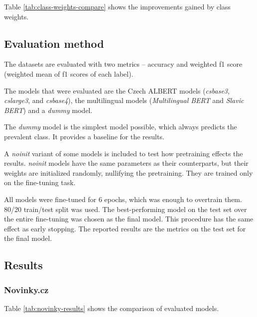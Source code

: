 \documentclass[
  printed, %
  color,   %
  table,   %
  oneside, %
  lof,     %
  lot,     %
]{fithesis3}
\begin{document}
Table \ref{tab:class-weights-compare} shows the improvements gained by class weights.


\subsection{Evaluation method}
\label{sec:class-eval-method}
The datasets are evaluated with two metrics -- accuracy and weighted f1 score (weighted mean of f1 scores of each label).

The models that were evaluated are the Czech ALBERT models (\textit{csbase3}, \textit{cslarge3}, and \textit{csbase4}), the multilingual models (\textit{Multilingual BERT} and \textit{Slavic BERT}) and a \textit{dummy} model. 

The \textit{dummy} model is the simplest model possible, which always predicts the prevalent class. It provides a baseline for the results.

A \textit{noinit} variant of some models is included to test how pretraining effects the results. \textit{noinit} models have the same parameters as their counterparts, but their weights are initialized randomly, nullifying the pretraining. They are trained only on the fine-tuning task.

All models were fine-tuned for 6 epochs, which was enough to overtrain them. 80/20 train/test split was used. The best-performing model on the test set over the entire fine-tuning was chosen as the final model. This procedure has the same effect as early stopping. The reported results are the metrics on the test set for the final model. 

\subsection{Results}
\subsubsection{Novinky.cz}

Table \ref{tab:novinky-results} shows the comparison of evaluated models.
\end{document}
